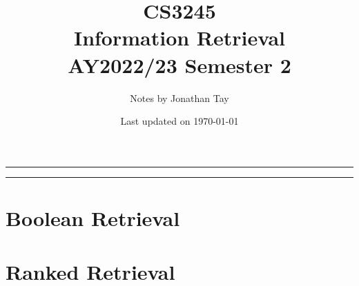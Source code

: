 \documentclass{article}
\title{\vspace{-1cm}\textbf{CS3245 \\[0.25em] Information Retrieval} \\[2em] \Large AY2022/23 Semester 2 \\[1em]}
\author{Notes by Jonathan Tay}
\date{Last updated on \today}
\newcommand{\pageline}[1]{\par\noindent\rule{\textwidth}{#1}} %
\begin{document}
\linespread{1.4}\selectfont
{} %
\maketitle
\pageline{1.5pt}
\tableofcontents
\pageline{1.5pt}
\linespread{1.1}\selectfont

\newpage
{} %
\begin{multicols*}{2}
    \part{Boolean Retrieval}
    
    
    \part{Ranked Retrieval}
    
    
\end{multicols*}
\end{document}
